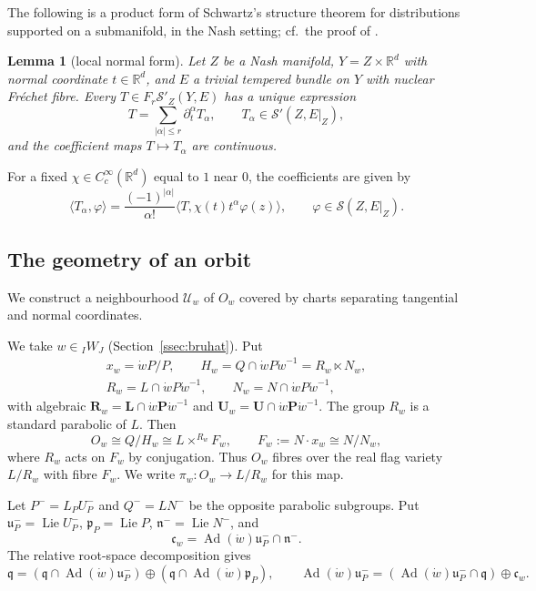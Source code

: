 \documentclass[a4paper,12pt]{amsart}
\numberwithin{equation}{section}
\newtheorem{lemma}[theorem]{Lemma}
\theoremstyle{definition}
\theoremstyle{remark}
\newcommand{\pP}{\mathbf P}
\newcommand{\lL}{\mathbf L}
\newcommand{\U}{\mathbf U}
\newcommand{\R}{\mathbb R}
\newcommand{\fq}{\mathfrak q}
\newcommand{\fp}{\mathfrak p}
\newcommand{\fn}{\mathfrak n}
\newcommand{\fc}{\mathfrak c}
\newcommand{\mcU}{\mathcal U}
\newcommand{\mcS}{\mathcal S}
\newcommand{\Ad}{\operatorname{Ad}}
\newcommand{\Lie}{\operatorname{Lie}}
\newcommand{\rR}{\mathbf R}
\begin{document}
The following is a product form of Schwartz's structure theorem for distributions supported on a submanifold, in the Nash setting; cf.\ the proof of \cite[Lemma~3.1]{SZ12}.

\begin{lemma}[local normal form]\label{lem:local-normal-form}
Let $Z$ be a Nash manifold, $Y=Z\times\R^d$ with normal coordinate $t\in\R^d$, and $E$ a trivial tempered bundle on $Y$ with nuclear Fr\'echet fibre. Every $T\in F_r\mcS'_Z(Y,E)$ has a unique expression
\[
 T=\sum_{|\alpha|\le r}\partial_t^\alpha T_\alpha,\qquad T_\alpha\in\mcS'(Z,E|_Z),
\]
and the coefficient maps $T\mapsto T_\alpha$ are continuous.
\end{lemma}

For a fixed $\chi\in C_c^\infty(\R^d)$ equal to $1$ near $0$, the coefficients are given by
\[
 \langle T_\alpha,\varphi\rangle
 =\frac{(-1)^{|\alpha|}}{\alpha!}
   \langle T,\chi(t)t^\alpha\varphi(z)\rangle,
 \qquad \varphi\in\mcS(Z,E|_Z).
\]

\subsection{The geometry of an orbit}\label{ssec:orbit-geometry}

We construct a neighbourhood $\mcU_w$ of $O_w$ covered by charts separating tangential and normal coordinates.

We take $w\in{}_IW_J$ (Section~\ref{ssec:bruhat}). Put
\[
\begin{gathered}
 x_w=\dot wP/P,\qquad H_w=Q\cap\dot wP\dot w^{-1}=R_w\ltimes N_w,\\
 R_w=L\cap\dot wP\dot w^{-1},\qquad N_w=N\cap\dot wP\dot w^{-1},
\end{gathered}
\]
with algebraic $\rR_w=\lL\cap\dot w\pP\dot w^{-1}$ and $\U_w=\U\cap\dot w\pP\dot w^{-1}$. The group $R_w$ is a standard parabolic of $L$. Then
\[
 O_w\cong Q/H_w\cong L\times^{R_w}F_w,\qquad F_w:=N\cdot x_w\cong N/N_w,
\]
where $R_w$ acts on $F_w$ by conjugation. Thus $O_w$ fibres over the real flag variety $L/R_w$ with fibre $F_w$. We write $\pi_w:O_w\to L/R_w$ for this map.

Let $P^-=L_PU_P^-$ and $Q^-=LN^-$ be the opposite parabolic subgroups. Put $\mathfrak u_P^-=\Lie U_P^-$, $\fp_P=\Lie P$, $\fn^-=\Lie N^-$, and
\[
 \fc_w=\Ad(\dot w)\mathfrak u_P^-\cap\fn^-.
\]
The relative root-space decomposition gives
\begin{equation}\label{eq:q-splitting}
 \fq=(\fq\cap\Ad(\dot w)\mathfrak u_P^-)\oplus(\fq\cap\Ad(\dot w)\fp_P),\qquad \Ad(\dot w)\mathfrak u_P^-=(\Ad(\dot w)\mathfrak u_P^-\cap\fq)\oplus\fc_w.
\end{equation}
\end{document}
